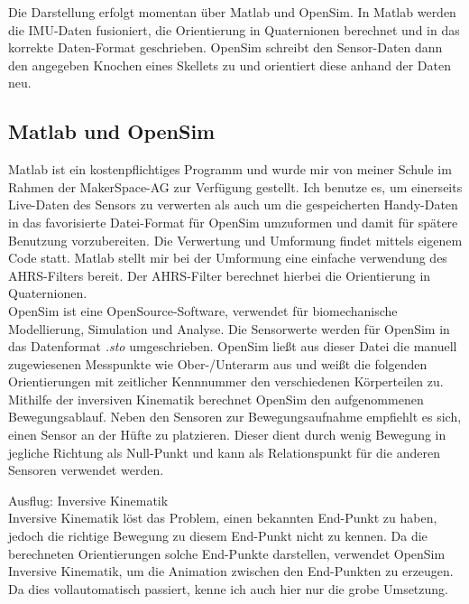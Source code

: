 Die Darstellung erfolgt momentan über Matlab und OpenSim. In Matlab werden die IMU-Daten
fusioniert, die Orientierung in Quaternionen berechnet und in das korrekte Daten-Format geschrieben. 
OpenSim schreibt den Sensor-Daten dann den angegeben Knochen eines Skellets zu und orientiert diese anhand 
der Daten neu.

\subsection{Matlab und OpenSim}
Matlab ist ein kostenpflichtiges Programm und wurde mir von meiner Schule im Rahmen der MakerSpace-AG zur Verfügung 
gestellt. Ich benutze es, um einerseits Live-Daten des Sensors zu verwerten als auch um die gespeicherten Handy-Daten 
in das favorisierte Datei-Format für OpenSim
umzuformen und damit für spätere Benutzung vorzubereiten. Die Verwertung und Umformung findet mittels eigenem Code statt.
Matlab stellt mir bei der Umformung eine einfache verwendung des AHRS-Filters
bereit. Der AHRS-Filter berechnet hierbei die Orientierung in Quaternionen. \\ 
OpenSim ist eine OpenSource-Software, verwendet für biomechanische Modellierung, Simulation und Analyse. 
Die Sensorwerte werden für OpenSim in das Datenformat \textit{.sto} umgeschrieben. OpenSim ließt aus dieser Datei die 
manuell zugewiesenen Messpunkte wie Ober-/Unterarm aus und weißt die folgenden Orientierungen mit zeitlicher Kennnummer
den verschiedenen Körperteilen zu. Mithilfe der inversiven Kinematik berechnet OpenSim den aufgenommenen Bewegungsablauf.
Neben den Sensoren zur Bewegungsaufnahme empfiehlt es sich, einen Sensor an der Hüfte zu platzieren. Dieser dient durch
wenig Bewegung in jegliche Richtung als Null-Punkt und kann als Relationspunkt für die anderen Sensoren verwendet werden.

{\Large Ausflug: Inversive Kinematik}\\
Inversive Kinematik löst das Problem, einen bekannten End-Punkt zu haben, jedoch die richtige 
Bewegung zu diesem End-Punkt nicht zu kennen. Da die berechneten Orientierungen solche End-Punkte darstellen, verwendet 
OpenSim Inversive Kinematik, um die Animation zwischen den End-Punkten zu erzeugen. Da dies vollautomatisch passiert, 
kenne ich auch hier nur die grobe Umsetzung.